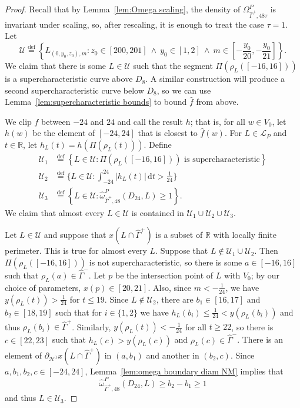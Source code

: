 \documentclass[11pt,reqno]{amsart}
\newcommand{\wwidehat}[1]{\widehat{#1}}
\newcommand{\R}{\mathbb{R}}
\newcommand{\cH}{\mathcal{H}}
\newcommand{\cL}{\mathcal{L}}
\newcommand{\cU}{\mathcal{U}}
\newcommand{\ud}[0]{\,\mathrm{d}}
\newcommand{\0}{\mathbf{0}}
\renewcommand{\1}{\mathbf 1}
\renewcommand{\mid}{:}
\newcommand{\eqdef}{\stackrel{\mathrm{def}}{=}}
\renewcommand{\ge}{\geqslant}
\renewcommand{\le}{\leqslant}
\theoremstyle{remark}
\begin{document}
\begin{proof}
  Recall that by Lemma~\ref{lem:Omega scaling}, the density of $\Omega^P_{\hat{\Gamma}^+,48\tau}$ is invariant under scaling, so, after rescaling, it is enough to treat the case $\tau=1$.  Let
  $$\cU\eqdef \left\{L_{(0,y_0,z_0),m}\mid z_0\in [200,201]\ \wedge\  y_0\in [1,2]\ \wedge\  m \in \left[-\frac{y_0}{20}, -\frac{y_0}{21}\right]\right\}.$$
  We claim that there is some $L\in \cU$ such that the segment $\Pi(\rho_L([-16,16]))$ is a supercharacteristic curve above $D_8$.  A similar construction will produce a second supercharacteristic curve below $D_8$, so we can use Lemma~\ref{lem:supercharacteristic bounds} to bound $\hat{f}$ from above.

  We clip $\hat{f}$ between $-24$ and $24$ and call the result $h$; that is, for all $w\in V_0$, let $h(w)$ be the element of $[-24,24]$ that is closest to $\hat{f}(w)$.  For $L\in \cL_P$ and $t\in \R$, let $h_L(t)=h(\Pi(\rho_L(t)))$.  Define
  \begin{align*}
  \cU_1&\eqdef \left\{L\in \cU\mid \text{$\Pi(\rho_L([-16,16]))$ is supercharacteristic}\right\}\\
  \cU_2&\eqdef \biggl\{L\in \cU\mid \int_{-24}^{24} |h_L(t)|\ud t>\frac{1}{24}\biggr\}\\
  \cU_3&\eqdef \left\{L\in \cU\mid \wwidehat{\omega}^P_{\hat{\Gamma}^+,48}(D_{24},L)\ge 1\right\}.
  \end{align*}
  We claim that almost every $L\in \cU$ is contained in  $\cU_1\cup\cU_2\cup \cU_3$.

  Let $L\in \cU$ and suppose that $x(L\cap \hat{\Gamma}^+)$ is a subset of $\R$ with locally finite perimeter.  This is true for almost every $L$.  Suppose that $L\not\in \cU_1\cup \cU_2$.  Then $\Pi(\rho_L([-16,16]))$ is not supercharacteristic, so there is some $a\in [-16,16]$ such that $\rho_L(a)\in \hat{\Gamma}^-$.  Let $p$ be the intersection point of $L$ with $V_0$; by our choice of parameters, $x(p)\in [20,21]$.  Also, since $m < -\frac{1}{24}$, we have $y(\rho_L(t)) > \frac{1}{24}$ for $t\le 19$.  Since $L\not \in \cU_2$, there are $b_1\in [16,17]$ and $b_2\in [18,19]$ such that for $i\in \{1,2\}$ we have $h_L(b_i)\le \frac{1}{24} < y(\rho_L(b_i))$ and thus $\rho_L(b_i)\in \hat{\Gamma}^+$.  Similarly, $y(\rho_L(t)) < -\frac{1}{24}$ for all $t\ge 22$, so there is $c \in [22,23]$ such that $h_L(c) > y(\rho_L(c))$  and $\rho_L(c)\in \hat{\Gamma}^-$.  There is an element of $\partial_{\cH^1}x(L\cap \hat{\Gamma}^+)$ in $(a,b_1)$ and another in $(b_2,c)$.  Since $a,b_1,b_2,c\in [-24,24]$, Lemma~\ref{lem:omega boundary diam NM} implies that
  $$\wwidehat{\omega}^P_{\hat{\Gamma}^+,48}(D_{24},L)\ge b_2-b_1\ge 1$$
  and thus $L\in \cU_3$.


\end{proof}
\end{document}
